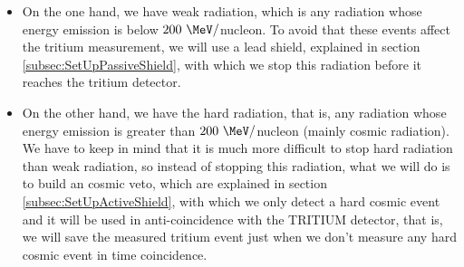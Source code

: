 \begin{itemize}

\item{}  On the one hand, we have weak radiation, which is any radiation whose energy emission is below $200~\MeV/$nucleon. To avoid that these events affect the tritium measurement, we will use a lead shield, explained in section \ref{subsec:SetUpPassiveShield}, with which we stop this radiation before it reaches the tritium detector.

\item{} On the other hand, we have the hard radiation, that is, any radiation whose energy emission is greater than $200~\MeV/$nucleon (mainly cosmic radiation). We have to keep in mind that it is much more difficult to stop hard radiation than weak radiation, so instead of stopping this radiation, what we will do is to build an cosmic veto, which are explained in section \ref{subsec:SetUpActiveShield}, with which we only detect a hard cosmic event and it will be used in anti-coincidence with the TRITIUM detector, that is, we will save the measured tritium event just when we don't measure any hard cosmic event in time coincidence.

\end{itemize}
